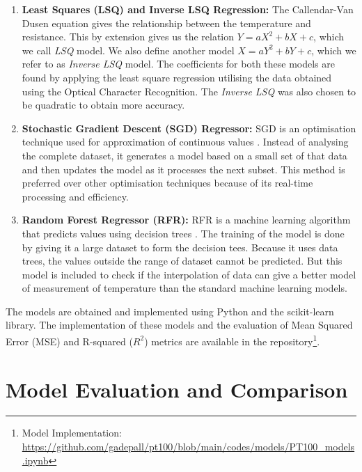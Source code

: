 \documentclass[conference]{IEEEtran}
\begin{document}
\begin{enumerate}
    \item \textbf{Least Squares (LSQ) and Inverse LSQ Regression:} 	The Callendar-Van Dusen equation gives the relationship between the temperature and resistance. This by extension gives us the relation $Y = aX^2 + bX + c$, which we call \textit{LSQ} model. We also define another model $X = aY^2 + bY + c$, which we refer to as \textit{Inverse LSQ} model. The coefficients for both these models are found by applying the least square regression utilising the data obtained using the Optical Character Recognition. The \textit{Inverse LSQ} was also chosen to be quadratic to obtain more accuracy.
    
    \item \textbf{Stochastic Gradient Descent (SGD) Regressor:} SGD is an optimisation technique used for approximation of continuous values \cite{SGD}. Instead of analysing the complete dataset, it generates a model based on a small set of that data and then updates the model as it processes the next subset. This method is preferred over other optimisation techniques because of its real-time processing and efficiency.
    
    \item \textbf{Random Forest Regressor (RFR):} RFR is a machine learning algorithm that predicts values using decision trees \cite{RFR}. The training of the model is done by giving it a large dataset to form the decision tees. Because it uses data trees, the values outside the range of dataset cannot be predicted. But this model is included to check if the interpolation of data can give a better model of measurement of temperature than the standard machine learning models.
\end{enumerate}

The models are obtained and implemented using Python and the scikit-learn\cite{scikit-learn} library.
The implementation of these models and the evaluation of Mean Squared Error (MSE) and R-squared ($R^2$) metrics are available in the repository\footnote{Model Implementation: \url{https://github.com/gadepall/pt100/blob/main/codes/models/PT100_models.ipynb}}.

\section{Model Evaluation and Comparison}
\end{document}
